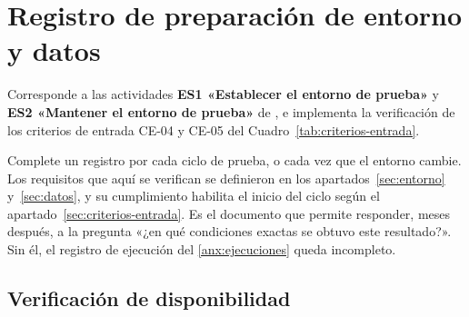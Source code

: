 \section{Registro de preparación de entorno y datos}
\label{anx:entorno}

\begin{notanormativa}
Corresponde a las actividades \textbf{ES1 «Establecer el entorno de prueba»} y \textbf{ES2
«Mantener el entorno de prueba»} de , e implementa la verificación de los criterios de
entrada CE-04 y CE-05 del Cuadro~\ref{tab:criterios-entrada}.
\end{notanormativa}

\begin{observacion}
\end{observacion}

\begin{instruccion}
Complete un registro por cada ciclo de prueba, o cada vez que el entorno cambie. Los requisitos
que aquí se verifican se definieron en los apartados~\ref{sec:entorno} y~\ref{sec:datos}, y su
cumplimiento habilita el inicio del ciclo según el apartado~\ref{sec:criterios-entrada}. Es el documento
que permite responder, meses después, a la pregunta «¿en qué condiciones exactas se obtuvo este
resultado?». Sin él, el registro de ejecución del \ref{anx:ejecuciones} queda incompleto.
\end{instruccion}

\subsection*{Verificación de disponibilidad}


